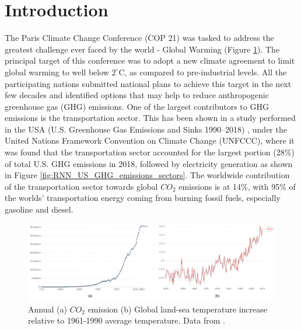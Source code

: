 \section{Introduction}

The Paris Climate Change Conference (COP 21) \parencite{agreement2015unfccc, agreement2015paris} was tasked to address the greatest challenge ever faced by the world - Global Warming (Figure \ref{fig:RNN_annual_carbon_data}). The principal target of this conference was to adopt a new climate agreement to limit global warming to well below $2^{\circ}$C, as compared to pre-industrial levels. All the participating nations submitted national plans to achieve this target in the next few decades and identified options that may help to reduce anthropogenic greenhouse gas (GHG) emissions. One of the largest contributors to GHG emissions is the transportation sector. This has been shown in a study performed in the USA (U.S. Greenhouse Gas Emissions and Sinks 1990–2018) \parencite{epa2018inventory}, under the United Nations Framework Convention on Climate Change (UNFCCC), where it was found that the transportation sector accounted for the largest portion (28\%) of total U.S. GHG emissions in 2018, followed by electricity generation as shown in Figure \ref{fig:RNN_US_GHG_emissions_sectors}. The worldwide contribution of the transportation sector towards global $CO_2$ emissions is at 14\%, with 95\% of the worlds' transportation energy coming from burning fossil fuels, especially gasoline and diesel.  

\begin{figure}[h!]
    \centering
    \includegraphics[width= \textwidth]{Figures/Chp_RNN/annual-carbon-data.png}
    \caption{Annual (a) $CO_2$ emission (b) Global land-sea temperature increase relative to 1961-1990 average temperature. Data from \parencite{friedlingstein2019global}.}
    \label{fig:RNN_annual_carbon_data}
\end{figure}

